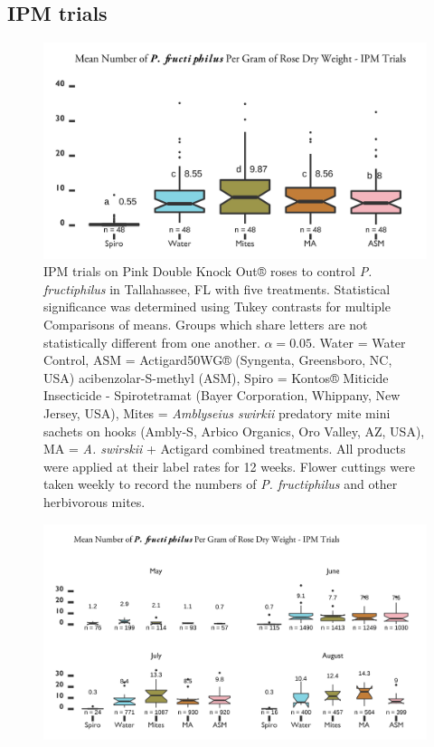 \documentclass[12pt,final,CPage]{ufthesis}
\begin{document}
{{  \subsection{IPM trials}\label{results-ipm}}
  \begin{figure}

  {\centering \includegraphics[width=0.8\linewidth]{figure/rrv_ipm_graph_erios_talla} 

  }

  \caption[IPM trials on Pink Double Knock Out® roses to control \textit{P. fructiphilus} in Tallahassee, FL with five treatments]{IPM trials on Pink Double Knock Out® roses to control \textit{P. fructiphilus} in Tallahassee, FL with five treatments. Statistical significance was determined using Tukey contrasts for multiple Comparisons of means. Groups which share letters are not statistically different from one another. $\alpha = 0.05$. Water = Water Control, ASM = Actigard50WG® (Syngenta, Greensboro, NC, USA) acibenzolar-S-methyl (ASM), Spiro = Kontos® Miticide Insecticide - Spirotetramat (Bayer Corporation, Whippany, New Jersey, USA), Mites = \textit{Amblyseius swirkii} predatory mite mini sachets on hooks (Ambly-S, Arbico Organics, Oro Valley, AZ, USA), MA = \textit{A. swirskii} + Actigard combined treatments. All products were applied at their label rates for 12 weeks. Flower cuttings were taken weekly to record the numbers of \textit{P. fructiphilus} and other herbivorous mites.}\label{fig:ipm-talla-erios}
  \end{figure}
  \begin{figure}

  {\centering \includegraphics[width=0.8\linewidth]{figure/rrv_ipm_graph_erios_talla_month} 

}
\end{figure}}
\end{document}
